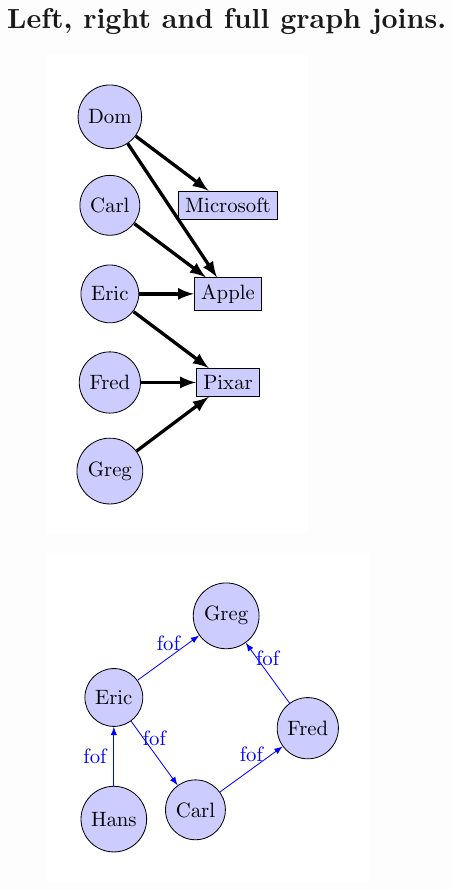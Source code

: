 

\section{Left, right and full graph joins.}\label{sec:leftrightfull}
\begin{figure}
	\centering
	\begin{minipage}[t]{0.3\textwidth}
		\centering
		\includegraphics[scale=.6]{fig/03joins/aaa_left_affiliation}
		\label{fig:companymembership}
	\end{minipage}\quad
	\begin{minipage}[t]{0.3\textwidth}
		\includegraphics[scale=.6]{fig/03joins/aaa_left_users2}

\end{minipage}
\end{figure}
